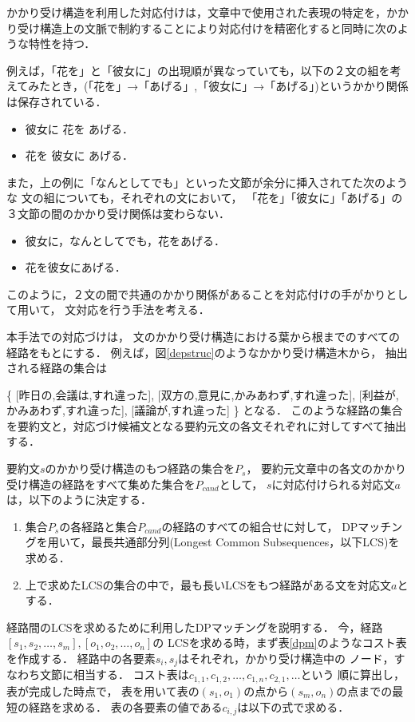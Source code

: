 かかり受け構造を利用した対応付けは，文章中で使用された表現の特定を，かかり受け構造上の文脈で制約することにより対応付けを精密化すると同時に次のような特性を持つ．

例えば，「花を」と「彼女に」の出現順が異なっていても，以下の２文の組を考えてみたとき，(「花を」→「あげる」,「彼女に」→「あげる」)というかかり関係は保存されている．

\begin{itemize}
\item 彼女に 花を あげる．
\item 花を 彼女に あげる．
\end{itemize}

また，上の例に「なんとしてでも」といった文節が余分に挿入されてた次のような
文の組についても，それぞれの文において，
「花を」「彼女に」「あげる」の３文節の間のかかり受け関係は変わらない．

\begin{itemize}
\item 彼女に，なんとしてでも，花をあげる．
\item 花を彼女にあげる．
\end{itemize}

このように，２文の間で共通のかかり関係があることを対応付けの手がかりとして用いて，
文対応を行う手法を考える．

本手法での対応づけは，
文のかかり受け構造における葉から根までのすべての経路をもとにする．
例えば，図\ref{depstruc}のようなかかり受け構造木から，
抽出される経路の集合は

\{
[昨日の,会議は,すれ違った],
[双方の,意見に,かみあわず,すれ違った],
[利益が,かみあわず,すれ違った],
[議論が,すれ違った]
\}
となる．
このような経路の集合を要約文と，対応づけ候補文となる要約元文の各文それぞれに対してすべて抽出する．

要約文$s$のかかり受け構造のもつ経路の集合を$P_s$，
要約元文章中の各文のかかり受け構造の経路をすべて集めた集合を$P_{cand}$として，
$s$に対応付けられる対応文$a$は，以下のように決定する．

\begin{enumerate}
\item 集合$P_s$の各経路と集合$P_{cand}$の経路のすべての組合せに対して，
DPマッチングを用いて，最長共通部分列(Longest Common Subsequences，以下LCS)を求める．
\item 上で求めたLCSの集合の中で，最も長いLCSをもつ経路がある文を対応文$a$とする．
\end{enumerate}

経路間のLCSを求めるために利用したDPマッチングを説明する．
今，経路$[s_1,s_2,\dots,s_m],[o_1,o_2,\dots,o_n]$の
LCSを求める時，まず表\ref{dpm}のようなコスト表を作成する．
経路中の各要素$s_i,s_j$はそれぞれ，かかり受け構造中の
ノード，すなわち文節に相当する．
コスト表は$c_{1,1},c_{1,2},\dots,c_{1,n},c_{2,1},\dots$という
順に算出し，表が完成した時点で，
表を用いて表の$(s_1,o_1)$の点から$(s_m,o_n)$の点までの最短の経路を求める．
表の各要素の値である$c_{i,j}$は以下の式で求める．

